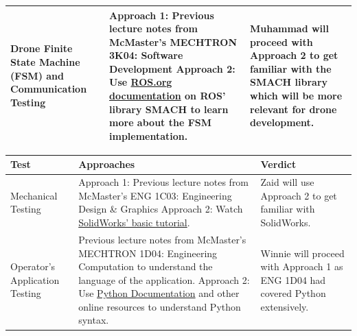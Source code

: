 \documentclass[12pt, titlepage]{article}
\begin{document}
\begin{table}[!h]
\begin{center}
\begin{tabular}{ | m{3cm} | m{7cm} | m{4cm} | }
\hline
Drone Finite State Machine (FSM) and Communication Testing & 
Approach 1: Previous lecture notes from McMaster's MECHTRON 3K04: Software Development \newline Approach 2: Use \href{http://wiki.ros.org/smach}{ROS.org documentation} on ROS' library SMACH to learn more about the FSM implementation. & Muhammad will proceed with Approach 2 to get familiar with the SMACH library which will be more relevant for drone development.\\
\hline
\end{tabular}
\end{center}
\end{table}

  
\begin{table}[!h]
\begin{center}
\label{KnowledgeTableB}

\begin{tabular}{ | m{3cm} | m{7cm} | m{4cm} | }

\hline
Test & Approaches & Verdict \\

\hline
Mechanical Testing & Approach 1: Previous lecture notes from McMaster's ENG 1C03: Engineering Design \& Graphics \newline Approach 2: Watch \href{https://www.youtube.com/watch?v=YmMDhzXitn0}{SolidWorks' basic tutorial}.& Zaid will use Approach 2 to get familiar with SolidWorks.\\  
\hline
Operator's Application Testing & Previous lecture notes from McMaster's MECHTRON 1D04: Engineering Computation  to understand the language of the application. \newline Approach 2: Use \href{https://docs.python.org/3/tutorial/}{Python Documentation} and other online resources to understand Python syntax. & Winnie will proceed with Approach 1 as ENG 1D04 had covered Python extensively.\\
\hline


\end{tabular}
\end{center}
\end{table}
\end{document}
